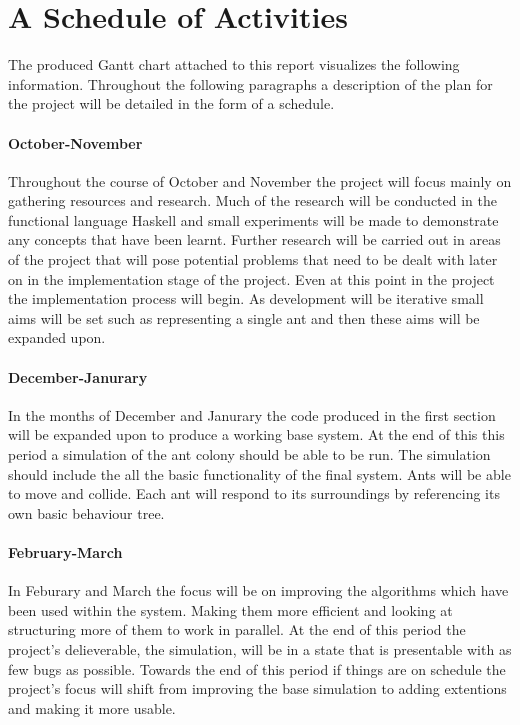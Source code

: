 \documentclass[main.tex]{subfiles}
\begin{document}
{{\section{A Schedule of Activities}
The produced Gantt chart attached to this report visualizes the following information. Throughout the following paragraphs a description of the plan for the project will be detailed in the form of a schedule. 

\paragraph{October-November}
Throughout the course of October and November the project will focus mainly on gathering resources  and research. Much of the research will be conducted in the functional language Haskell and small experiments will be made to demonstrate any concepts that have been learnt. Further research will be carried out in areas of the project that will pose potential problems that need to be dealt with later on in the implementation stage of the project. Even at this point in the project the implementation process will begin. As development will be iterative small aims will be set such as representing a single ant and then these aims will be expanded upon.

\paragraph{December-Janurary}
In the months of December and Janurary the code produced in the first section will be expanded upon to produce a working base system. At the end of this this period a simulation of the ant colony should be able to be run. The simulation should include the all the basic functionality of the final system. Ants will be able to move and collide. Each ant will respond to its surroundings by referencing its own basic behaviour tree.

\paragraph{February-March}
In Feburary and March the focus will be on improving the algorithms which have been used within the system. Making them more efficient and looking at structuring more of them to work in parallel. At the end of this period the project's delieverable, the simulation, will be in a state that is presentable with as few bugs as possible. Towards the end of this period if things are on schedule the project's focus will shift from improving the base simulation to adding extentions and making it more usable.

}}
\end{document}
